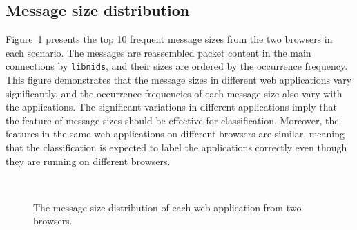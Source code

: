 \subsection{Message size distribution}
Figure~\ref{Fig.msg_size_distribution} presents the top 10 frequent message sizes from the two browsers in each scenario. The messages are reassembled packet content in the main connections by \texttt{libnids}, and their sizes are ordered by the occurrence frequency. This figure demonstrates that the message sizes in different web applications vary significantly, and the occurrence frequencies of each message size also vary with the applications. The significant variations in different applications imply that the feature of message sizes should be effective for classification. Moreover, the features in the same web applications on different browsers are similar, meaning that the classification is expected to label the applications correctly even though they are running on different browsers.  

\begin{figure}[H]
\centering
{}\\
\caption{The message size distribution of each web application from two browsers.}
\label{Fig.msg_size_distribution}
\end{figure}

